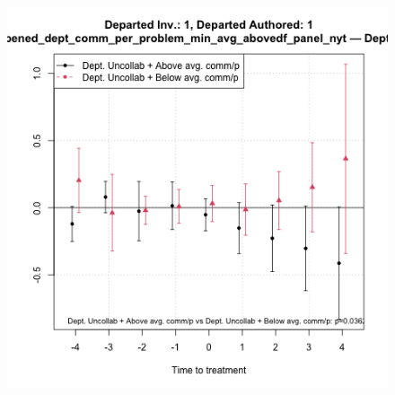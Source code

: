 \begin{figure}[htbp]
\begin{minipage}[b]{0.24\textwidth}
    \label{fig:prs_opened_comm_collab_nonint}
    \end{minipage}
    \hfill
    \begin{minipage}[b]{0.24\textwidth}
        \centering
        \includegraphics[width=\textwidth]{temp/output/collab_imp/auth_n1_inv_n1_cs_norm_prs_opened_dept_comm_per_problem_min_avg_above_Dept.Uncollab.png}
    \label{fig:prs_opened_comm_uncollab_per_nonint}
    \end{minipage}
    \hfill
        \begin{minipage}[b]{0.24\textwidth}
        \centering

\end{minipage}
\end{figure}

